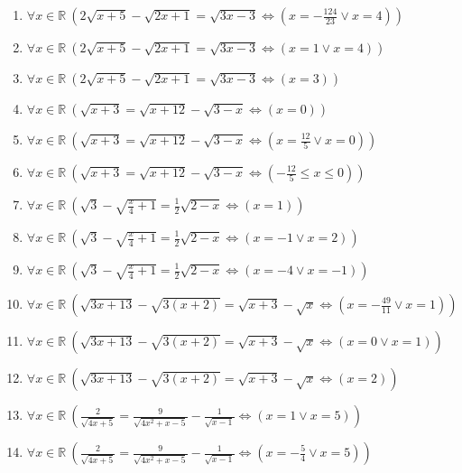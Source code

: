 \documentclass[11pt,a4paper]{article}
\begin{document}
\begin{enumerate}
\item $\displaystyle \forall x \in \mathbb{R}\ \left( 2\sqrt{x + 5} - \sqrt{2x + 1} = \sqrt{3x - 3} \iff \left( x = -\frac{124}{23} \lor x = 4 \right) \right)$
\item $\displaystyle \forall x \in \mathbb{R}\ \left( 2\sqrt{x + 5} - \sqrt{2x + 1} = \sqrt{3x - 3} \iff \left( x = 1 \lor x = 4 \right) \right)$
\item $\displaystyle \forall x \in \mathbb{R}\ \left( 2\sqrt{x + 5} - \sqrt{2x + 1} = \sqrt{3x - 3} \iff \left( x = 3 \right) \right)$
\item $\displaystyle \forall x \in \mathbb{R}\ \left( \sqrt{x + 3} = \sqrt{x + 12} - \sqrt{3 - x} \iff \left( x = 0 \right) \right)$
\item $\displaystyle \forall x \in \mathbb{R}\ \left( \sqrt{x + 3} = \sqrt{x + 12} - \sqrt{3 - x} \iff \left( x = \frac{12}{5} \lor x = 0 \right) \right)$
\item $\displaystyle \forall x \in \mathbb{R}\ \left( \sqrt{x + 3} = \sqrt{x + 12} - \sqrt{3 - x} \iff \left( -\frac{12}{5} \le x \le 0 \right) \right)$
\item $\displaystyle \forall x \in \mathbb{R}\ \left( \sqrt{3} - \sqrt{\frac{x}{4} + 1} = \frac{1}{2}\sqrt{2 - x} \iff \left( x = 1 \right) \right)$
\item $\displaystyle \forall x \in \mathbb{R}\ \left( \sqrt{3} - \sqrt{\frac{x}{4} + 1} = \frac{1}{2}\sqrt{2 - x} \iff \left( x = -1 \lor x = 2 \right) \right)$
\item $\displaystyle \forall x \in \mathbb{R}\ \left( \sqrt{3} - \sqrt{\frac{x}{4} + 1} = \frac{1}{2}\sqrt{2 - x} \iff \left( x = -4 \lor x = -1 \right) \right)$
\item $\displaystyle \forall x \in \mathbb{R}\ \left( \sqrt{3x + 13} - \sqrt{3(x + 2)} = \sqrt{x + 3} - \sqrt{x} \iff \left( x = -\frac{49}{11} \lor x = 1 \right) \right)$
\item $\displaystyle \forall x \in \mathbb{R}\ \left( \sqrt{3x + 13} - \sqrt{3(x + 2)} = \sqrt{x + 3} - \sqrt{x} \iff \left( x = 0 \lor x = 1 \right) \right)$
\item $\displaystyle \forall x \in \mathbb{R}\ \left( \sqrt{3x + 13} - \sqrt{3(x + 2)} = \sqrt{x + 3} - \sqrt{x} \iff \left( x = 2 \right) \right)$
\item $\displaystyle \forall x \in \mathbb{R}\ \left( \frac{2}{\sqrt{4x + 5}} = \frac{9}{\sqrt{4x^{2} + x - 5}} - \frac{1}{\sqrt{x - 1}} \iff \left( x = 1 \lor x = 5 \right) \right)$
\item $\displaystyle \forall x \in \mathbb{R}\ \left( \frac{2}{\sqrt{4x + 5}} = \frac{9}{\sqrt{4x^{2} + x - 5}} - \frac{1}{\sqrt{x - 1}} \iff \left( x = -\frac{5}{4} \lor x = 5 \right) \right)$

\end{enumerate}
\end{document}
